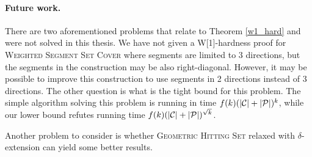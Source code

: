 \paragraph{Future work.} There are two aforementioned problems
that relate to Theorem \ref{w1_hard} and were not solved in this thesis.
We have not given a W[1]-hardness proof
for \textsc{Weighted} \textsc{Segment} \textsc{Set} \textsc{Cover} where segments are limited to 3 directions,
but the segments in the construction may be also right-diagonal.
However, it may be possible to improve this construction to use segments
in 2 directions instead of 3 directions. 
The other question is what is the tight bound for this problem.
The simple algorithm solving
this problem is running in time ${f(k)(|\mathcal{C}| + |\mathcal{P}|)^k}$,
while our lower bound refutes running time ${f(k)(|\mathcal{C}| + |\mathcal{P}|)^{\sqrt{k}}}$.

Another problem to consider is whether
\textsc{Geometric Hitting Set} relaxed with $\delta$-extension
can yield some better results.
